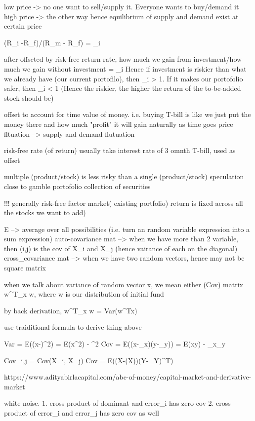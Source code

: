 low price  -> no one want to sell/supply it. Everyone wants to buy/demand it
high price -> the other way
hence equilibrium of supply and demand exist at certain price

(R_i -R_f)/(R_m - R_f) = \beta_i

after offseted by risk-free return rate, how much we gain from investment/how much we gain without investment = \beta_i
Hence if investment is riskier than what we already have (our current portofilo), then \beta_i > 1. If it makes our portofolio safer, then \beta_i < 1
(Hence the riskier, the higher the return of the to-be-added stock should be) 

offset to account for time value of money. i.e. buying T-bill is like we just put the money there and how much "profit" it will gain naturally as time goes
price fltuation --> supply and demand flutuation

risk-free rate (of return)
	usually take interest rate of 3 omnth T-bill, used as offset

multiple (product/stock) is less risky than a single (product/stock)
speculation ~ close to gamble		
portofolio
	collection of securities

!!! generally risk-free factor
market( existing portfolio) return is fixed across all the stocks we want to add)


E --> average over all possibilities (i.e. turn an random variable expression into a sum expression)
auto-covariance mat --> when we have more than 2 variable, then (i,j) is the cov of X_i and X_j (hence vairance of each on the diagonal)
cross_covariance mat --> when we have two random vectors, hence may not be square matrix



when we talk about variance of random vector x, we mean either
	\Sigma (Cov) matrix
	w^T\Sigma_x w, where w is our distribution of initial fund
	
	by back derivation, w^T\Sigma_x w = Var(w^Tx)
	
	use traiditional formula to derive thing above

Var = E((x-\mu)^2) = E(x^2) - \mu^2
Cov = E((x-\mu_x)(y-\mu_y)) = E(xy) - \mu_x\mu_y

Cov_{i,j} = Cov(X_i, X_j)
Cov = E((X-\mu(X))(Y-\mu_Y)^T)

https://www.adityabirlacapital.com/abc-of-money/capital-market-and-derivative-market



white noise.
	1. cross product of dominant and error_i has zero cov
	2. cross product of error_i and error_j has zero cov as well




